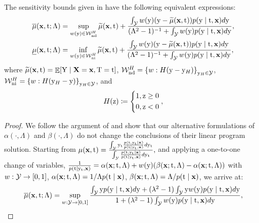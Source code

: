 \begin{lemma}
    \label{lem:monotonic}
    The sensitivity bounds given in  have the following equivalent expressions:
    \begin{equation*}
        \begin{split}
            \overline{\mu}(\mathbf{x}, \mathrm{t}; \Lambda) &= \sup_{w(\mathrm{y}) \in \mathcal{W}_{\textrm{nd}}^{H}} \widetilde{\mu}(\mathbf{x}, \mathrm{t}) + \frac{\int_{\mathcal{Y}} w(\mathrm{y}) (\mathrm{y} - \widetilde{\mu}(\mathbf{x}, \mathrm{t})) p(\mathrm{y} \mid \mathrm{t}, \mathbf{x})d\mathrm{y}}{(\Lambda^2 - 1)^{-1} + \int_{\mathcal{Y}} w(\mathrm{y})p(\mathrm{y} \mid \mathrm{t}, \mathbf{x})d\mathrm{y}}, \\
            \underline{\mu}(\mathbf{x}, \mathrm{t}; \Lambda) &= \inf_{w(\mathrm{y}) \in \mathcal{W}_{\textrm{ni}}^{H}} \widetilde{\mu}(\mathbf{x}, \mathrm{t}) + \frac{\int_{\mathcal{Y}} w(\mathrm{y}) (\mathrm{y} - \widetilde{\mu}(\mathbf{x}, \mathrm{t})) p(\mathrm{y} \mid \mathrm{t}, \mathbf{x})d\mathrm{y}}{(\Lambda^2 - 1)^{-1} + \int_{\mathcal{Y}} w(\mathrm{y})p(\mathrm{y} \mid \mathrm{t}, \mathbf{x})d\mathrm{y}},
        \end{split}
    \end{equation*}
    where $\widetilde{\mu}(\mathbf{x}, \mathrm{t}) = \mathop{\mathbb{E}}[\mathrm{Y} \mid \mathbf{X}=\mathbf{x}, \mathrm{T}=\mathrm{t}]$, $\mathcal{W}_{\textrm{nd}}^{H} = \left\{w: H(\mathrm{y} - \mathrm{y}_{H}) \right\}_{\mathrm{y}_{H} \in \mathcal{Y}}$, $\mathcal{W}_{\textrm{ni}}^{H} = \left\{w: H(\mathrm{y}_{H} - \mathrm{y}) \right\}_{\mathrm{y}_{H} \in \mathcal{Y}}$, and
    \begin{equation*}
        H(\mathrm{z}) \coloneqq 
        \begin{dcases*}
            1, \mathrm{z} \geq 0 \\
            0, \mathrm{z} < 0
        \end{dcases*},
    \end{equation*}
    \begin{proof}
        We follow the argument of \cite{kallus2019interval} and show that our alternative formulations of $\alpha(\cdot, \Lambda)$ and $\beta(\cdot, \Lambda)$ do not change the conclusions of their linear program solution. 
        Starting from $\mu(\mathbf{x}, \mathrm{t}) = \frac{\int_{\mathcal{Y}} \mathrm{y}_{\mathrm{t}} \frac{p(\mathrm{t}, \mathrm{y}_{\mathrm{t}} \mid \mathbf{x})}{p(\mathrm{t} \mid \mathrm{y}_{\mathrm{t}}, \mathbf{x})}d\mathrm{y}_{\mathrm{t}}}{\int_{\mathcal{Y}} \frac{p(\mathrm{t}, \mathrm{y}_{\mathrm{t}} \mid \mathbf{x})}{p(\mathrm{t} \mid \mathrm{y}_{\mathrm{t}}, \mathbf{x})}d\mathrm{y}_{\mathrm{t}}},$ and applying a one-to-one change of variables, $\frac{1}{p(\mathrm{t} \mid \mathrm{y}_{\mathrm{t}}, \mathbf{x})} = \alpha(\mathbf{x}; \mathrm{t}, \Lambda) + w(\mathrm{y}) (\beta(\mathbf{x}; \mathrm{t}, \Lambda) - \alpha(\mathbf{x}; \mathrm{t}, \Lambda))$ with $w:\mathcal{Y} \to [0, 1]$, $\alpha(\mathbf{x}; \mathrm{t}, \Lambda) = 1 / \Lambda p(\mathrm{t} \mid \mathbf{x})$, $\beta(\mathbf{x}; \mathrm{t}, \Lambda) = \Lambda / p(\mathrm{t} \mid \mathbf{x})$, we arrive at:
        \begin{equation}
            \label{eq:upper_capo_app}
            \overline{\mu}(\x, \tf; \Lambda) 
            = \sup_{w: \Ycal \to [0, 1]} \frac{\int_{\Ycal} \y p(\y \mid \tf, \x)d\y + (\lambda^2 - 1)\int_{\Ycal} \y w(\y)p(\y \mid \tf, \x)d\y}{1 + (\lambda^2 - 1)\int_{\Ycal} w(\y)p(\y \mid \tf, \x)d\y},

\end{equation}
\end{proof}
\end{lemma}

